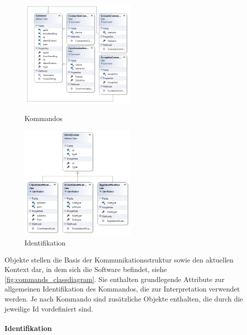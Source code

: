 \begin{figure}
	\begin{center}
		\includegraphics[width=0.5\textwidth]{images/uml/commands.png}
	\end{center}
	\caption{Kommandos}
	\label{fig:commands_classdiagram}
	\begin{center}
		\includegraphics[width=0.5\textwidth]{images/uml/identification.png}
	\end{center}
	\caption{Identifikation}
	\label{fig:identification_classdiagram}
\end{figure}

Objekte stellen die Basis der Kommunikationsstruktur sowie den aktuellen Kontext dar, in dem sich die Software befindet, siehe \ref{fig:commands_classdiagram}. Sie enthalten grundlegende Attribute zur allgemeinen Identifikation des Kommandos, die zur Interpretation verwendet werden. Je nach Kommando sind zusätzliche Objekte enthalten, die durch die jeweilige Id vordefiniert sind.\\

\paragraph{Identifikation}


